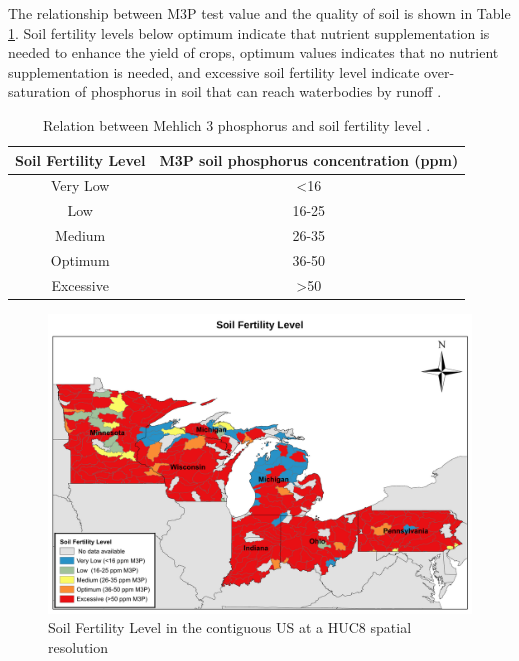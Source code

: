 \documentclass[10pt,a4paper]{article}
\begin{document}
The relationship between M3P test value and the quality of soil is shown in Table \ref{table:soil_fertility}. Soil fertility levels below optimum indicate that nutrient supplementation is needed to enhance the yield of crops, optimum values indicates that no nutrient supplementation is needed, and excessive soil fertility level indicate over-saturation of phosphorus in soil that can reach waterbodies by runoff .

\begin{table}[H]
	\centering
	\caption{Relation between Mehlich 3 phosphorus and soil fertility level \protect{}.}
	\label{table:soil_fertility}
	\begin{tabular}{@{}cc@{}}
		\toprule
		Soil Fertility Level & M3P soil phosphorus concentration (ppm) \\ \midrule
		Very Low             & \textless{}16                           \\
		Low                  & 16-25                                   \\
		Medium               & 26-35                                   \\
		Optimum              & 36-50                                   \\
		Excessive            & \textgreater{}50                        \\ \bottomrule
	\end{tabular}
\end{table}

%

\begin{figure}[H]
	\centering
	\includegraphics[width=0.95\linewidth, trim={0cm 0cm 0cm 0cm},clip]{SoilFertility.pdf} 
	\caption{Soil Fertility Level in the contiguous US at a HUC8 spatial resolution}
	\label{fig:SoilFertilitySoilFertility}
\end{figure}
\end{document}
